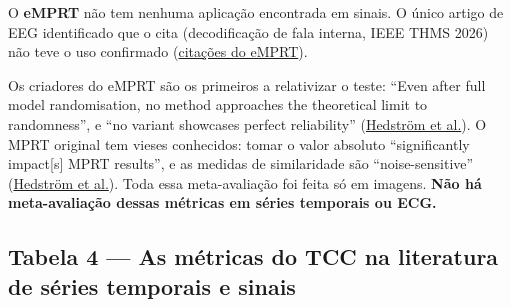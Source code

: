 \documentclass[11pt,a4paper]{article}
\begin{document}
O \textbf{eMPRT} não tem nenhuma aplicação encontrada em sinais. O único artigo de EEG identificado que o cita (decodificação de fala interna, IEEE THMS 2026) não teve o uso confirmado (\href{https://api.semanticscholar.org/graph/v1/paper/arXiv:2401.06465/citations}{citações do eMPRT}).

Os criadores do eMPRT são os primeiros a relativizar o teste: ``Even after full model randomisation, no method approaches the theoretical limit to randomness'', e ``no variant showcases perfect reliability'' (\href{https://arxiv.org/abs/2401.06465}{Hedström et al.}). O MPRT original tem vieses conhecidos: tomar o valor absoluto ``significantly impact[s] MPRT results'', e as medidas de similaridade são ``noise-sensitive'' (\href{https://arxiv.org/abs/2401.06465}{Hedström et al.}). Toda essa meta-avaliação foi feita só em imagens. \textbf{Não há meta-avaliação dessas métricas em séries temporais ou ECG.}

\subsection{Tabela 4 — As métricas do TCC na literatura de séries temporais e sinais}
\end{document}
